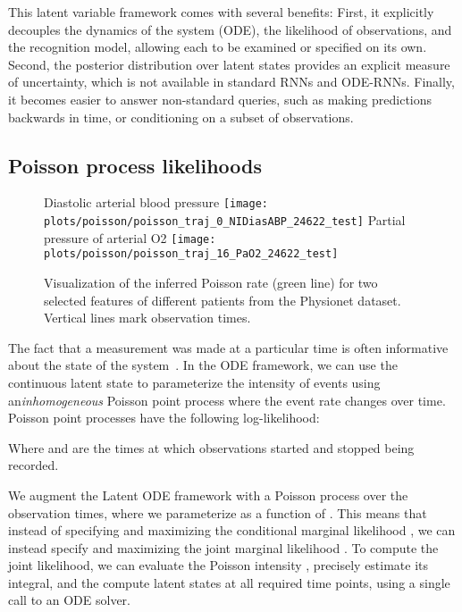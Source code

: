 \documentclass{article}
\begin{document}
This latent variable framework comes with several benefits:
First, it explicitly decouples the dynamics of the system (ODE), the likelihood of observations, and the recognition model, allowing each to be examined or specified on its own.
Second, the posterior distribution over latent states provides an explicit measure of uncertainty, which is not available in standard RNNs and ODE-RNNs.
Finally, it becomes easier to answer non-standard queries, such as making predictions backwards in time, or conditioning on a subset of observations.


\subsection{Poisson process likelihoods}

\begin{wrapfigure}[22]{r}{0.30\textwidth}
    \vspace{-6mm}
	\centering
	{\footnotesize Diastolic arterial blood pressure}
    \texttt{[image: plots/poisson/poisson\_traj\_0\_NIDiasABP\_24622\_test]}
    {\footnotesize Partial pressure of arterial O2}
     \texttt{[image: plots/poisson/poisson\_traj\_16\_PaO2\_24622\_test]}
    \caption{Visualization of the inferred Poisson rate  (green line) for two selected features of different patients from the Physionet dataset. Vertical lines mark observation times.} 
    \label{fig:poisson}
\end{wrapfigure}
The fact that a measurement was made at a particular time is often informative about the state of the system~\citep{che_sontag_2018}.
In the ODE framework, we can use the continuous latent state to parameterize the intensity of events using an\emph{inhomogeneous} Poisson point process \citep{palm1943intensitatsschwankungen} where the event rate  changes over time.
Poisson point processes have the following log-likelihood:

Where  and  are the times at which observations started and stopped being recorded.

We augment the Latent ODE framework with a Poisson process over the observation times, where we parameterize  as a function of .
This means that instead of specifying and maximizing the conditional marginal likelihood , we can instead specify and maximizing the joint marginal likelihood .
To compute the joint likelihood, we can evaluate the Poisson intensity , precisely estimate its integral, and the compute latent states at all required time points, using a single call to an ODE solver.
\end{document}
